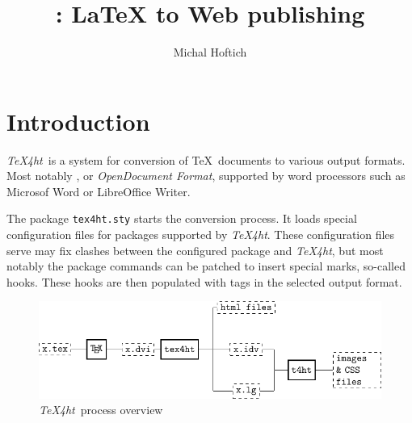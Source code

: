 \documentclass{ltugproc}
\author{Michal Hoftich}
\title{\texfourht: LaTeX to Web publishing}
\newcommand\term[1]{\textit{#1}}
\newcommand\packagename[1]{\texttt{#1.sty}}
\newcommand\texfourht{\term{\TeX4ht}}
\begin{document}
\maketitle

\section{Introduction}
\texfourht\ is a system for conversion of \TeX\ documents to various output
formats. Most notably \HTML, or \term{OpenDocument Format}, supported by word processors such as Microsof Word or LibreOffice
Writer. 



The package \packagename{tex4ht} starts the conversion process. It loads special 
configuration files for packages supported by \texfourht. These configuration
files serve may fix clashes between the configured package and \texfourht, but most
notably the package commands
can be patched to insert special marks, so-called hooks. These hooks
are then populated with tags in the selected output format. 


\begin{figure}[htp]
  \includegraphics[width=\textwidth]{img/tex4ht_process.pdf}
\caption{\texfourht\ process overview}
\label{fig:overview}
\end{figure}
\end{document}
